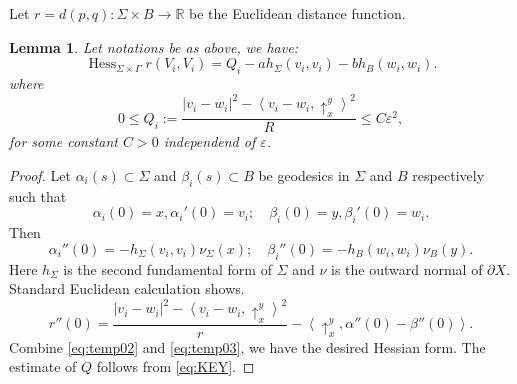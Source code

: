 \documentclass[reqno, 11pt]{amsart}
\theoremstyle{plain}
\newtheorem{lemma}[lemma]{Lemma}
\theoremstyle{definition}
\theoremstyle{remark}
\numberwithin{equation}{section}
\begin{document}
Let $r = d(p, q): \Sigma\times B \to \mathbb{R}$ be the Euclidean distance function.
\begin{lemma}\label{lem:Hessofr}
	Let notations be as above, we have:
	\[
		\operatorname{Hess}_{\Sigma\times\Gamma}r(V_i,V_i) = Q_{i} - a h_\Sigma(v_i, v_i)-b h_{B}(w_i, w_i).
	\]
	where
	\begin{equation}\label{eq:KEY01}
		0\le Q_{i}:= \frac{|v_{i}-w_{i}|^{2} - \left\langle v_{i}-w_{i}, \uparrow_{x}^{y} \right\rangle ^{2}}{R}\le C \varepsilon^{2},
	\end{equation}
	for some constant $C>0$ independend of $\varepsilon$.
\end{lemma}
\begin{proof}
	Let $\alpha_{i}(s)\subset \Sigma$ and $\beta_{i}(s)\subset B$ be geodesics in $\Sigma$ and $B$ respectively such that
	\begin{equation*}
	\alpha_{i}(0)=x, \alpha_{i}'(0)=v_{i}; \quad \beta_{i}(0)=y, \beta_{i}'(0)=w_{i}.
	\end{equation*}
	Then
	\begin{equation}\label{eq:temp02}
	\alpha_{i}''(0)=-h_{\Sigma}(v_{i}, v_{i}) \nu_{\Sigma}(x);\quad \beta_{i}''(0)=-h_{B}(w_{i}, w_{i})\nu_{B}(y).
	\end{equation}
	Here $h_{\Sigma}$ is the second fundamental form of $\Sigma$ and $\nu$ is the outward normal of $\partial X$. Standard Euclidean calculation shows.
	\begin{equation}\label{eq:temp03}
		r''(0) = \frac{|v_{i}-w_{i}|^{2} - \left\langle v_{i}-w_{i}, \uparrow_{x}^{y} \right\rangle ^{2}}{r} 
		- \left\langle \uparrow_{x}^{y}, \alpha''(0)-\beta''(0) \right\rangle.
	\end{equation}
	Combine \eqref{eq:temp02} and \eqref{eq:temp03}, we have the desired Hessian form. The estimate of $Q$ follows from \eqref{eq:KEY}.
\end{proof}
\end{document}
